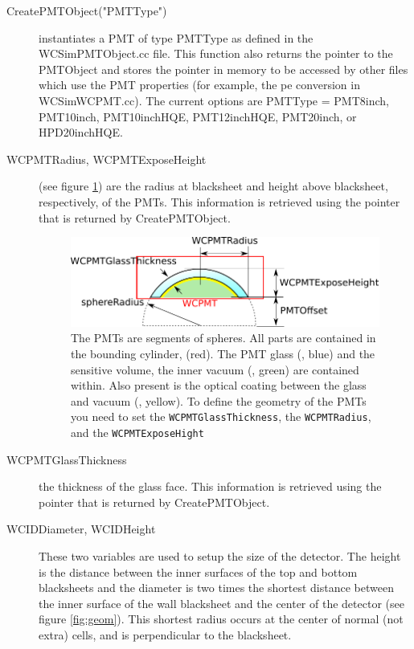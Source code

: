 \begin{description}
\item[CreatePMTObject("PMTType")] instantiates a PMT of type PMTType as defined in the WCSimPMTObject.cc file. This function also returns the pointer to the PMTObject and stores the pointer in memory to be accessed by other files which use the PMT properties (for example, the pe conversion in WCSimWCPMT.cc). The current options are PMTType = PMT8inch, PMT10inch, PMT10inchHQE, PMT12inchHQE, PMT20inch, or HPD20inchHQE. 

\item[WCPMTRadius, WCPMTExposeHeight] (see figure \ref{fig:pmt}) are the radius at blacksheet and height above blacksheet, respectively, of the PMTs. This information is retrieved using the pointer that is returned by CreatePMTObject.

\begin{figure}
  \begin{center}
    \includegraphics{PMT}
  \end{center}
\caption{The PMTs are segments of spheres.  All parts are contained in the bounding cylinder,  (red).  The PMT glass (, blue) and the sensitive volume, the inner vacuum (, green) are contained within. Also present is the optical coating between the glass and vacuum (, yellow).  To define the geometry of the PMTs you need to set the \texttt{WCPMTGlassThickness}, the \texttt{WCPMTRadius}, and the \texttt{WCPMTExposeHight}}\label{fig:pmt}
\end{figure}

\item[WCPMTGlassThickness] the thickness of the glass face. This information is retrieved using the pointer that is returned by CreatePMTObject.

\item[WCIDDiameter, WCIDHeight] These two variables are used to setup the size of the detector. The height is the distance between the inner surfaces of the top and bottom blacksheets and the diameter is two times the shortest distance between the inner surface of the wall blacksheet and the center of the detector (see figure \ref{fig:geom}).  This shortest radius occurs at the center of normal (not extra) cells, and is perpendicular to the blacksheet.


\end{description}
